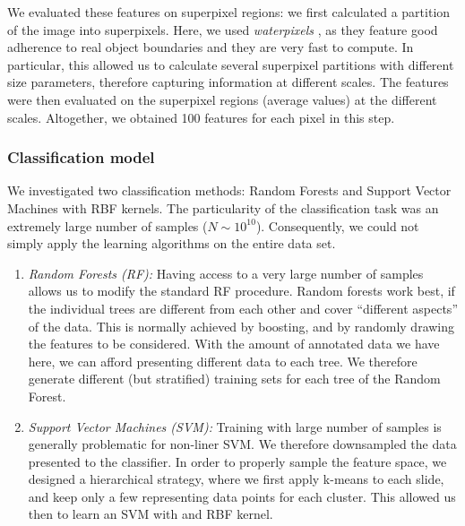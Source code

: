 \documentclass{article}
\begin{document}
We evaluated these features on superpixel regions: we first calculated
a partition of the image into superpixels. Here, we used
\textit{waterpixels} \cite{waterpixels}, as they feature good
adherence to real object boundaries and they are very fast to
compute.  In particular, this allowed us to calculate several
superpixel partitions with different size parameters, therefore capturing
information at different scales. The features were then evaluated on
the superpixel regions (average values) at the different
scales. Altogether, we obtained 100 features for each pixel in this step. 

%
%
\subsubsection*{Classification model}
We investigated two classification methods: Random Forests and Support
Vector Machines with RBF kernels. The particularity of the
classification task was an extremely large number of samples ($N \sim  10^{10}$).
Consequently, we could not simply apply the learning algorithms on the
entire data set.  
\begin{enumerate}
\item {\it Random Forests (RF):} Having access to a very large number of
  samples allows us to modify the standard RF procedure. Random
  forests work best, if the individual trees are different from each
  other and cover ``different aspects'' of the data. This is normally
  achieved by boosting, and by randomly drawing the features to be
  considered. With the amount of annotated data we have here, we can
  afford presenting different data to each tree. We therefore generate
  different (but stratified) training sets for each tree of the Random
  Forest.  
\item {\it Support Vector Machines (SVM):} Training with large number
  of samples is generally problematic for non-liner SVM. We therefore
  downsampled the data presented to the classifier. In order to
  properly sample the feature space, we designed a hierarchical
  strategy, where we first apply k-means to each slide, and keep only
  a few representing data points for each cluster. This allowed us
  then to learn an SVM with and RBF kernel. 
\end{enumerate}
\end{document}
